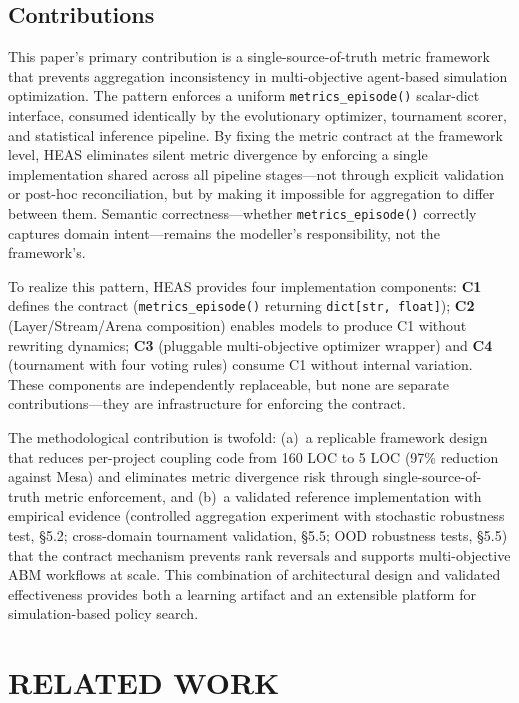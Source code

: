 \documentclass{wscpaperproc}
\begin{document}
\subsection{Contributions}
\label{sec:intro-contributions}

This paper's primary contribution is a single-source-of-truth metric framework that prevents
aggregation inconsistency in multi-objective agent-based simulation optimization.
The pattern enforces a uniform \texttt{metrics\_episode()} scalar-dict interface,
consumed identically by the evolutionary optimizer, tournament scorer, and statistical
inference pipeline. By fixing the metric contract at the framework level, HEAS
eliminates silent metric divergence by enforcing a single implementation shared across all
pipeline stages---not through explicit validation or post-hoc reconciliation, but by making
it impossible for aggregation to differ between them. Semantic correctness---whether \texttt{metrics\_episode()} correctly captures domain intent---remains the modeller's responsibility, not the framework's.

To realize this pattern, HEAS provides four implementation components:
\textbf{C1} defines the contract (\texttt{metrics\_episode()} returning
\texttt{dict[str, float]}); \textbf{C2} (Layer/Stream/Arena composition) enables
models to produce C1 without rewriting dynamics; \textbf{C3} (pluggable multi-objective
optimizer wrapper) and \textbf{C4} (tournament with four voting rules) consume C1
without internal variation. These components are independently replaceable, but none
are separate contributions---they are infrastructure for enforcing the contract.

The methodological contribution is twofold: (a)~a replicable framework design that
reduces per-project coupling code from 160 LOC to 5 LOC (97\% reduction against Mesa)
and eliminates metric divergence risk through single-source-of-truth metric enforcement, and (b)~a validated reference
implementation with empirical evidence (controlled aggregation experiment with stochastic robustness test, \S5.2;
cross-domain tournament validation, \S5.5; OOD robustness tests, \S5.5) that the
contract mechanism prevents rank reversals and supports multi-objective ABM workflows
at scale. This combination of architectural design and validated effectiveness provides
both a learning artifact and an extensible platform for simulation-based policy search.

\section{RELATED WORK}
\end{document}
